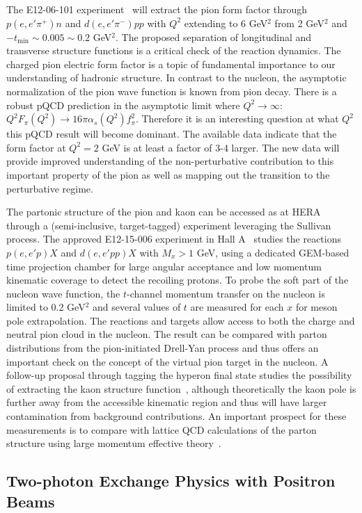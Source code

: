 The E12-06-101 experiment~\cite{CLAS12spin} will extract the pion form factor through $p(e,e'\pi^+)n$ and $d(e,e'\pi^-)pp$ with $Q^2$ extending to 6 GeV$^2$ from 2 GeV$^2$ and $-t_{\min} \sim 0.005\sim 0.2$ GeV$^2$. The proposed separation of longitudinal and transverse
structure functions is a critical check of the reaction dynamics. The charged pion electric form factor is a topic of fundamental importance to our understanding of hadronic structure. In contrast to the nucleon, the asymptotic normalization of the pion wave function is known from pion decay. There is a robust pQCD prediction in the asymptotic limit where $Q^2\rightarrow \infty$: $Q^2F_\pi(Q^2)\rightarrow 16\pi\alpha_s(Q^2)f_\pi^2$. Therefore it is an interesting question at what $Q^2$ this pQCD result will become dominant. The available data indicate that the form factor at $Q^2=2$ GeV is at least a factor of 3-4 larger. The new data will provide improved understanding of the non-perturbative contribution to this important property of the pion as well as mapping out the transition to the perturbative regime. 

The partonic structure of the pion and kaon can be accessed as at HERA through a (semi-inclusive, target-tagged) experiment leveraging the Sullivan process. The approved E12-15-006 experiment in Hall A~\cite{E12-15-006} studies the reactions $p(e,e'p)X$ and $d(e,e'pp)X$ with $M_x > 1$ GeV, using a dedicated GEM-based time projection chamber for large angular acceptance and low momentum kinematic coverage to detect the recoiling protons. To probe the soft part of the nucleon wave function, the $t$-channel momentum transfer on the nucleon is limited to 0.2 GeV$^2$ and several values of $t$ are measured for each $x$ for meson pole extrapolation. The reactions and targets allow access to both the charge and neutral pion
cloud in the nucleon. The result can be compared with parton distributions from the pion-initiated Drell-Yan process and thus offers an important check on the concept of the virtual pion target in the nucleon. A follow-up proposal
through tagging the hyperon final state studies the possibility of extracting the kaon structure function~\cite{C12-15-006A}, although theoretically the kaon pole is further away
from the accessible kinematic region and thus will have larger contamination
from background contributions.  An important prospect for these measurements is to compare with lattice QCD
calculations of the parton structure using large momentum effective theory~\cite{Ji:2020ect}. 

\subsection{Two-photon Exchange Physics with Positron Beams} 

